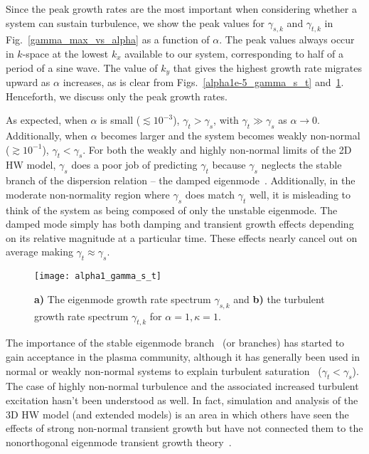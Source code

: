 \documentclass[twocolumn,showkeys,superscriptaddress]{revtex4}
\begin{document}
Since the peak growth rates are the most important when considering whether a system can sustain turbulence, we show the peak values for $\gamma_{s,k}$ and $\gamma_{t,k}$ in Fig.~\ref{gamma_max_vs_alpha} as a function of $\alpha$. 
The peak values always occur in $k$-space at the lowest $k_x$ available to our system, corresponding to half of a period of a sine wave. The value of $k_y$ that gives the highest growth rate migrates upward as $\alpha$ increases,
as is clear from Figs.~\ref{alpha1e-5_gamma_s_t} and~\ref{alpha1_gamma_s_t}. Henceforth, we discuss only the peak growth rates.

As expected, when $\alpha$ is small ($\lesssim 10^{-3}$), $\gamma_{t} > \gamma_{s}$, with
$\gamma_{t} \gg \gamma_{s}$ as $\alpha \to 0$. Additionally, when $\alpha$ becomes larger and the system becomes weakly non-normal ($\gtrsim 10^{-1}$), $\gamma_{t} < \gamma_{s}$.
For both the weakly and highly non-normal limits of the 2D HW model, $\gamma_{s}$ does a poor job of predicting $\gamma_{t}$ because $\gamma_{s}$ neglects the stable branch of the
dispersion relation -- the damped eigenmode~\cite{makwana2011}. 
Additionally, in the moderate non-normality region where $\gamma_{s}$ does match $\gamma_{t}$ well, it is misleading to think of the system as being composed of only the unstable eigenmode. 
The damped mode simply has both damping and transient growth effects depending on its relative magnitude at a particular time. These effects nearly cancel out on average making $\gamma_{t} \approx \gamma_{s}$.

\begin{figure}
\centerline{\texttt{[image: alpha1\_gamma\_s\_t]}}
\caption{{\bf a)} The eigenmode growth rate spectrum $\gamma_{s,k}$ and {\bf b)} the turbulent growth rate spectrum $\gamma_{t,k}$ for $\alpha = 1, \kappa=1$.}
\label{alpha1_gamma_s_t}
\end{figure}

The importance of the stable eigenmode branch~\cite{baver2002} (or branches) has started to gain acceptance in the plasma community, although it has generally been used in normal
or weakly non-normal systems to explain turbulent saturation~\cite{terry2006b,hatch2011,makwana2011} ($\gamma_{t} < \gamma_{s}$). 
The case of highly non-normal turbulence and the associated increased turbulent excitation hasn't been understood as well. 
In fact, simulation and analysis of the 3D HW model (and extended models) is an area in which others have seen the effects of strong non-normal transient growth
but have not connected them to the nonorthogonal eigenmode transient growth theory~\cite{biskamp1995,drake1995,scott2002,scott2005,umansky2009,friedman2012b}.
\end{document}
